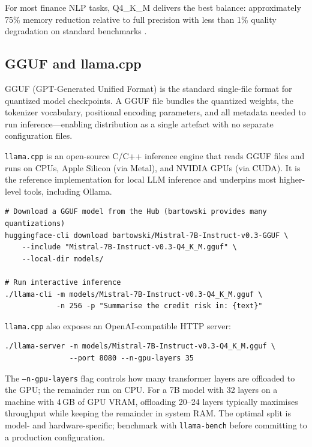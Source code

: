 For most finance NLP tasks, Q4\_K\_M delivers the best balance: approximately
75\% memory reduction relative to full precision with less than 1\% quality
degradation on standard benchmarks \citep{llamacpp2023}.

\subsection{GGUF and llama.cpp}
\label{app:hf:llamacpp}

GGUF (GPT-Generated Unified Format) is the standard single-file format for
quantized model checkpoints.  A GGUF file bundles the quantized weights,
the tokenizer vocabulary, positional encoding parameters, and all metadata
needed to run inference---enabling distribution as a single artefact with no
separate configuration files.

\texttt{llama.cpp} is an open-source C/C++ inference engine that reads GGUF
files and runs on CPUs, Apple Silicon (via Metal), and NVIDIA GPUs (via CUDA).
It is the reference implementation for local LLM inference and underpins most
higher-level tools, including Ollama.

\begin{verbatim}
# Download a GGUF model from the Hub (bartowski provides many quantizations)
huggingface-cli download bartowski/Mistral-7B-Instruct-v0.3-GGUF \
    --include "Mistral-7B-Instruct-v0.3-Q4_K_M.gguf" \
    --local-dir models/

# Run interactive inference
./llama-cli -m models/Mistral-7B-Instruct-v0.3-Q4_K_M.gguf \
            -n 256 -p "Summarise the credit risk in: {text}"
\end{verbatim}

\texttt{llama.cpp} also exposes an OpenAI-compatible HTTP server:

\begin{verbatim}
./llama-server -m models/Mistral-7B-Instruct-v0.3-Q4_K_M.gguf \
               --port 8080 --n-gpu-layers 35
\end{verbatim}

\begin{deepdive}
The \texttt{--n-gpu-layers} flag controls how many transformer layers are
offloaded to the GPU; the remainder run on CPU.  For a 7B model with 32
layers on a machine with 4\,GB of GPU VRAM, offloading 20--24 layers
typically maximises throughput while keeping the remainder in system RAM.
The optimal split is model- and hardware-specific; benchmark with
\texttt{llama-bench} before committing to a production configuration.
\end{deepdive}

